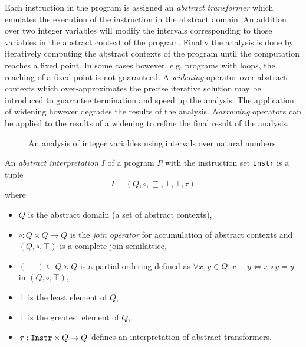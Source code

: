 Each instruction in the program is assigned an \emph{abstract transformer} which emulates the execution of the instruction in the abstract domain. An addition over two integer variables will modify the intervals corresponding to those variables in the abstract context of the program. Finally the analysis is done by iteratively computing the abstract contexts of the program until the computation reaches a fixed point. In some cases however, e.g. programs with loops, the reaching of a fixed point is not guaranteed. A \emph{widening} operator over abstract contexts which over-approximates the precise iterative solution may be introduced to guarantee termination and speed up the analysis. The application of widening however degrades the results of the analysis. \emph{Narrowing} operators can be applied to the results of a widening to refine the final result of the analysis.

\begin{figure}[H]
    \centering
    \caption{An analysis of integer variables using intervals over natural numbers}
    \label{fig_absintr_intervals}
\end{figure}

\begin{defn}
An \emph{abstract interpretation} $I$ of a program $P$ with the instruction set \texttt{Instr} is a tuple $$I = (Q, \circ, \sqsubseteq, \bot, \top, \tau)$$ where
\begin{itemize}
    \item $Q$ is the abstract domain (a set of abstract contexts),
    \item $\circ: Q \times Q \rightarrow Q$ is the \emph{join operator} for accumulation of abstract contexts and $(Q, \circ, \top)$ is a complete join-semilattice,
    \item $(\sqsubseteq) \subseteq Q \times Q$ is a partial ordering defined as $\forall x, y \in Q: x \sqsubseteq y \Leftrightarrow x \circ y = y$ in $(Q,\circ, \top)$,
    \item $\bot$ is the least element of $Q$,
    \item $\top$ is the greatest element of $Q$,
    \item $\tau: \text{\texttt{Instr}}\times Q \rightarrow Q$ defines an interpretation of abstract transformers.
\end{itemize}
\end{defn}

